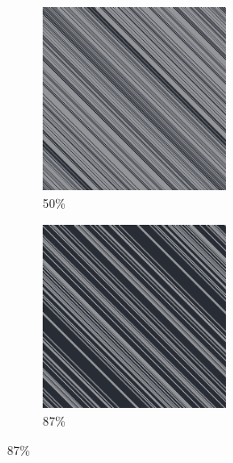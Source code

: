 \documentclass[12pt, fleqn]{report}                             %
\theoremstyle{break}                                            %
\begin{document}
\begin{figure}[ht!]
\begin{subfigure}[b]{0.4\linewidth}
          \includegraphics[width=0.6\textwidth]{Images/56/c.png}
          \caption{50\%}
        \end{subfigure}
        \begin{subfigure}[b]{0.4\linewidth}
          \includegraphics[width=0.6\textwidth]{Images/56/d.png}
          \caption{87\%}
        \end{subfigure}
      \end{figure}
\end{document}
